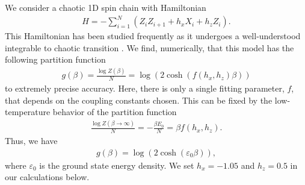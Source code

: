 \documentclass[a4paper,11pt]{article}
\begin{document}
\begin{enumerate}
We consider a chaotic 1D spin chain with Hamiltonian
\begin{align}
 H = -\sum_{i=1}^N\left(Z_iZ_{i+1}+h_x X_i+h_z Z_i \right).
 \label{H_spin_chain}
\end{align}
This Hamiltonian has been studied frequently as it undergoes a well-understood integrable to chaotic transition \cite{2011PhRvL.106e0405B}.
We find, numerically, that this model has the following partition function
\begin{align}
 g(\beta) = \frac{\log Z(\beta)}{N} = \log \left(2 \cosh \left(f(h_x,h_z) \beta\right)\right)
\end{align}
to extremely precise accuracy. Here, there is only a single fitting parameter, $f$, that depends on the coupling constants chosen. This can be fixed by the low-temperature behavior of the partition function
\begin{align}
 \frac{\log Z(\beta\rightarrow \infty)}{N} = -\frac{\beta E_0}{N} = \beta f(h_x,h_z).
\end{align}
Thus, we have
\begin{align}
 g(\beta) =\log \left(2 \cosh \left(\varepsilon_0 \beta\right)\right),
 \label{g_prediction}
\end{align}
where $\varepsilon_0$ is the ground state energy density. We set $h_x =-1.05$ and $h_z=0.5$ in our calculations below. 


\end{enumerate}
\end{document}
